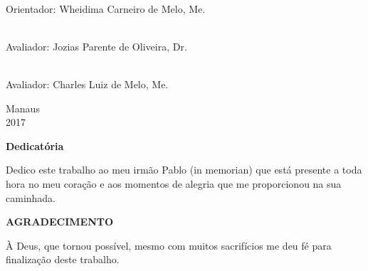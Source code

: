 \documentclass[12pt, a4paper]{article}
\begin{document}
\begin{minipage}[l]{14cm}
\begin{center}
\hspace{1cm}\uline{\hspace{10.5cm}} \\
\hspace{1cm}Orientador: Wheidima Carneiro de Melo, Me.

\hspace{1cm}\uline{\hspace{10.5cm}} \\
\hspace{1cm}Avaliador: Jozias Parente de Oliveira, Dr.

\hspace{1cm}\uline{\hspace{10.5cm}} \\
\hspace{1cm}Avaliador: Charles Luiz de Melo, Me.

\end{center}
\end{minipage}

\hspace*{8cm}

\vspace*{\fill}
\begin{center}
Manaus\\2017
\end{center}



\newpage
\thispagestyle{empty}
\begin{flushright}
\begin{minipage}{8cm}
\begin{singlespace}
{\begin{center}\vspace{18cm}\textbf{\normalsize Dedicatória}\vspace{36pt}\end{center}}
Dedico este trabalho ao meu irmão Pablo (in memorian) que está presente a toda hora no meu coração e aos momentos de alegria que me proporcionou na sua caminhada.\\[50pt]
\end{singlespace}
\end{minipage}
\end{flushright}
\newpage
\thispagestyle{empty}
\vspace*{4.5cm}
{\begin{center}\textbf{\normalsize AGRADECIMENTO}\vspace{36pt}\end{center}}
\hspace*{0.8cm}À Deus, que tornou possível, mesmo com muitos sacrifícios me deu fé para finalização deste trabalho.
\end{document}
